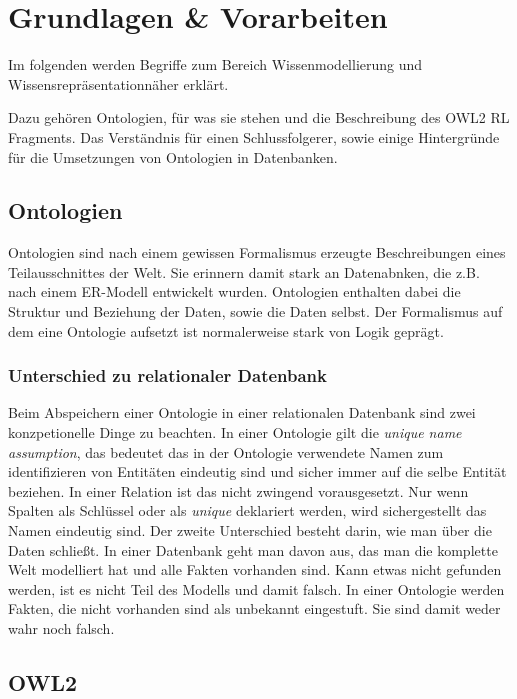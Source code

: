 \chapter{Grundlagen \& Vorarbeiten}
\label{kapitel-grundlagen}
Im folgenden werden Begriffe zum Bereich Wissenmodellierung und Wissensrepräsentationnäher erklärt.

Dazu gehören Ontologien, für was sie stehen und die Beschreibung des OWL2 RL Fragments. Das Verständnis für einen Schlussfolgerer, sowie einige Hintergründe für die Umsetzungen von Ontologien in Datenbanken.

\section{Ontologien}

Ontologien sind nach einem gewissen Formalismus erzeugte Beschreibungen eines Teilausschnittes der Welt. Sie erinnern damit stark an Datenabnken, die  z.B. nach einem ER-Modell entwickelt wurden. Ontologien enthalten dabei die Struktur und Beziehung der Daten, sowie die Daten selbst. Der Formalismus auf dem eine Ontologie aufsetzt ist normalerweise stark von Logik geprägt. \cite{Hesse2002}

\subsection{Unterschied zu relationaler Datenbank}

Beim Abspeichern einer Ontologie in einer relationalen Datenbank sind zwei konzpetionelle Dinge zu beachten. In einer Ontologie gilt die \emph{unique name assumption}, das bedeutet das in der Ontologie verwendete Namen zum identifizieren von Entitäten eindeutig sind und sicher immer auf die selbe Entität beziehen. In einer Relation ist das nicht zwingend vorausgesetzt. Nur wenn Spalten als Schlüssel oder als \emph{unique} deklariert werden, wird sichergestellt das Namen eindeutig sind.
Der zweite Unterschied besteht darin, wie man über die Daten schließt. In einer Datenbank geht man davon aus, das man die komplette Welt modelliert hat und alle Fakten vorhanden sind. Kann etwas nicht gefunden werden, ist es nicht Teil des Modells und damit falsch. In einer Ontologie werden Fakten, die nicht vorhanden sind als unbekannt eingestuft. Sie sind damit weder wahr noch falsch.

\section{OWL2}
\label{abschnitt-owl2}

